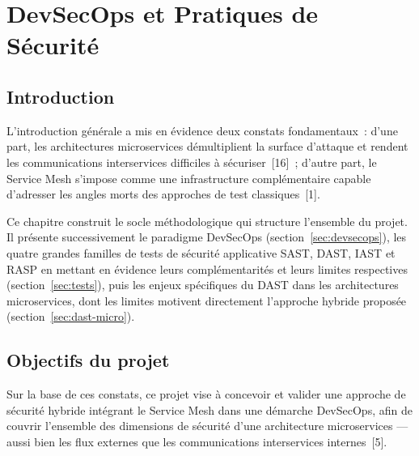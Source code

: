 \setcounter{chapter}{0}

\chapter{DevSecOps et Pratiques de Sécurité}

\section*{Introduction}
\label{sec:introduction-ch1}

L'introduction générale a mis en évidence deux constats fondamentaux~: d'une
part, les architectures microservices démultiplient la surface d'attaque et
rendent les communications interservices difficiles à sécuriser~[16]~; d'autre
part, le Service Mesh s'impose comme une infrastructure complémentaire capable
d'adresser les angles morts des approches de test classiques~[1].

Ce chapitre construit le socle méthodologique qui structure l'ensemble du
projet. Il présente successivement le paradigme DevSecOps
(section~\ref{sec:devsecops}), les quatre grandes familles de tests de sécurité
applicative SAST, DAST, IAST et RASP en mettant en évidence leurs
complémentarités et leurs limites respectives (section~\ref{sec:tests}), puis
les enjeux spécifiques du DAST dans les architectures microservices, dont les
limites motivent directement l'approche hybride proposée
(section~\ref{sec:dast-micro}).

\section{Objectifs du projet}
\label{sec:objectifs}

Sur la base de ces constats, ce projet vise à concevoir et valider une approche
de sécurité hybride intégrant le Service Mesh dans une démarche DevSecOps, afin
de couvrir l'ensemble des dimensions de sécurité d'une architecture microservices
--- aussi bien les flux externes que les communications interservices
internes~[5].

